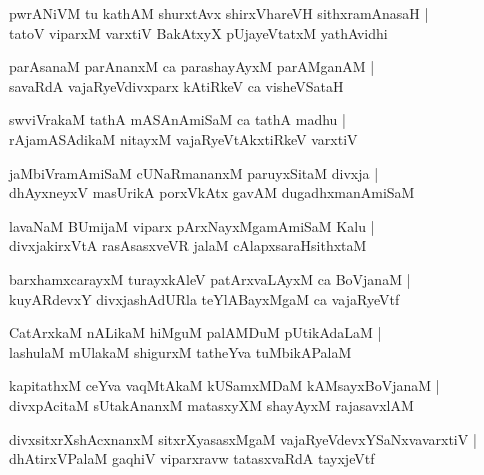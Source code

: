 \begin{shloka}
pwrANiVM tu kathAM shurxtAvx shirxVhareVH sithxramAnasaH |\\
tatoV viparxM varxtiV BakAtxyX pUjayeVtatxM yathAvidhi
\end{shloka}

\begin{shloka}
parAsanaM parAnanxM ca parashayAyxM parAMganAM |\\
savaRdA vajaRyeVdivxparx kAtiRkeV ca visheVSataH
\end{shloka}

\begin{shloka}
swviVrakaM tathA mASAnAmiSaM ca tathA madhu |\\
rAjamASAdikaM nitayxM vajaRyeVtAkxtiRkeV varxtiV
\end{shloka}

\begin{shloka}
jaMbiVramAmiSaM cUNaRmananxM paruyxSitaM divxja |\\
dhAyxneyxV masUrikA porxVkAtx gavAM dugadhxmanAmiSaM
\end{shloka}

\begin{shloka}
lavaNaM BUmijaM viparx pArxNayxMgamAmiSaM Kalu |\\
divxjakirxVtA rasAsasxveVR jalaM cAlapxsaraHsithxtaM
\end{shloka}

\begin{shloka}
barxhamxcarayxM turayxkAleV patArxvaLAyxM ca BoVjanaM |\\
kuyARdevxY divxjashAdURla teYlABayxMgaM ca vajaRyeVtf 
\end{shloka}

\begin{shloka}
CatArxkaM nALikaM hiMguM palAMDuM pUtikAdaLaM |\\
lashulaM mUlakaM shigurxM tatheYva tuMbikAPalaM
\end{shloka}

\begin{shloka}
kapitathxM ceYva vaqMtAkaM kUSamxMDaM kAMsayxBoVjanaM |\\
divxpAcitaM sUtakAnanxM matasxyXM shayAyxM rajasavxlAM
\end{shloka}

\begin{shloka}
divxsitxrXshAcxnanxM sitxrXyasasxMgaM vajaRyeVdevxYSaNxvavarxtiV |\\
dhAtirxVPalaM gaqhiV viparxravw tatasxvaRdA tayxjeVtf
\end{shloka}

